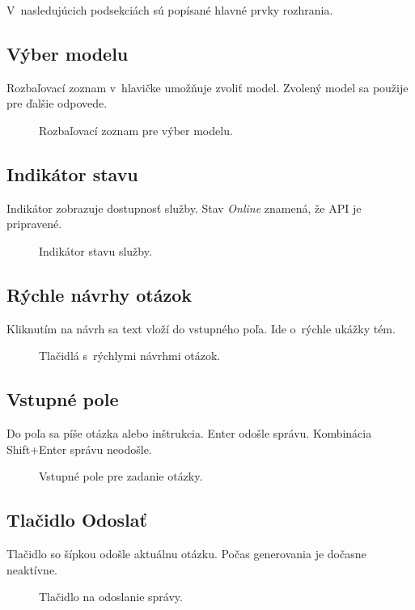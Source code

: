 V~nasledujúcich podsekciách sú popísané hlavné prvky rozhrania.

\subsection{Výber modelu}

Rozbaľovací zoznam v~hlavičke umožňuje zvoliť model. Zvolený model sa použije pre ďalšie odpovede.

\begin{figure}[ht]
	\centering
	\caption{Rozbaľovací zoznam pre výber modelu.}
	\label{fig:model_select}
\end{figure}

\subsection{Indikátor stavu}

Indikátor zobrazuje dostupnosť služby. Stav \emph{Online} znamená, že API je pripravené.

\begin{figure}[ht]
	\centering
	\caption{Indikátor stavu služby.}
	\label{fig:online}
\end{figure}

\subsection{Rýchle návrhy otázok}

Kliknutím na návrh sa text vloží do vstupného poľa. Ide o~rýchle ukážky tém.

\begin{figure}[ht]
	\centering
	\caption{Tlačidlá s~rýchlymi návrhmi otázok.}
	\label{fig:question_template}
\end{figure}

\subsection{Vstupné pole}

Do poľa sa píše otázka alebo inštrukcia. Enter odošle správu. Kombinácia Shift+Enter správu neodošle.

\begin{figure}[ht]
	\centering
	\caption{Vstupné pole pre zadanie otázky.}
	\label{fig:question_field}
\end{figure}

\subsection{Tlačidlo Odoslať}

Tlačidlo so šípkou odošle aktuálnu otázku. Počas generovania je dočasne neaktívne.

\begin{figure}[ht]
	\centering
	\caption{Tlačidlo na odoslanie správy.}
	\label{fig:send_button}
\end{figure}
